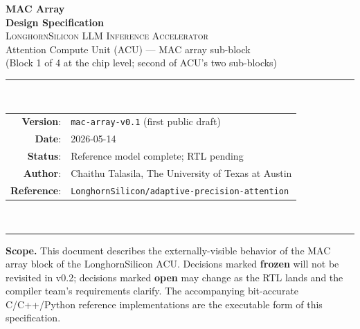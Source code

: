 \documentclass[11pt]{article}
\begin{document}
\thispagestyle{empty}
\begin{center}
\vspace*{1.2in}
{\Huge\bfseries MAC Array}\\[0.4em]
{\LARGE\bfseries Design Specification}\\[1.2em]

{\large \textsc{LonghornSilicon LLM Inference Accelerator}}\\[0.4em]
{\large Attention Compute Unit (ACU) --- MAC array sub-block}\\[0.3em]
{\normalsize (Block 1 of 4 at the chip level; second of ACU's two sub-blocks)}\\[2em]

\rule{0.7\textwidth}{0.4pt}\\[1em]

\begin{tabular}{rl}
\textbf{Version}:    & \texttt{mac-array-v0.1} (first public draft) \\
\textbf{Date}:       & 2026-05-14 \\
\textbf{Status}:     & Reference model complete; RTL pending \\
\textbf{Author}:     & Chaithu Talasila, The University of Texas at Austin \\
\textbf{Reference}:  & \texttt{LonghornSilicon/adaptive-precision-attention} \\
\end{tabular}\\[1em]
\rule{0.7\textwidth}{0.4pt}

\vfill
\begin{minipage}{0.85\textwidth}
\small
\textbf{Scope.} This document describes the externally-visible behavior of
the MAC array block of the LonghornSilicon ACU. Decisions marked
\textbf{frozen} will not be revisited in v0.2; decisions marked
\textbf{open} may change as the RTL lands and the compiler team's
requirements clarify. The accompanying bit-accurate C/C++/Python
reference implementations are the executable form of this specification.
\end{minipage}

\vspace{0.3in}
\end{center}

\clearpage

\tableofcontents
\clearpage
\end{document}
